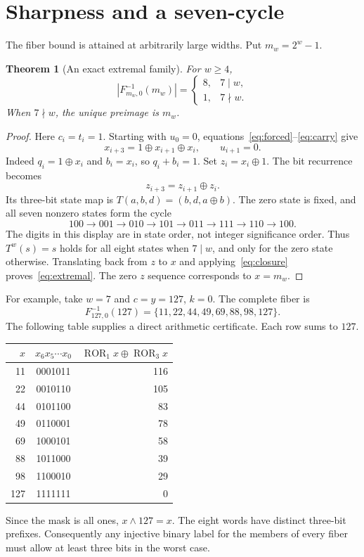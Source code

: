 \documentclass[11pt,a4paper]{article}
\newtheorem{theorem}{Theorem}
\newcommand{\xor}{\mathbin{\oplus}}
\DeclareMathOperator{\ROR}{ROR}
\begin{document}
\section{Sharpness and a seven-cycle}\label{sec:sharp}
The fiber bound is attained at arbitrarily large widths. Put $m_w=2^w-1$.

\begin{theorem}[An exact extremal family]\label{thm:sharp}
For $w\ge4$,
\begin{equation}\label{eq:extremal}
 |F_{m_w,0}^{-1}(m_w)|=
 \begin{cases}8,&7\mid w,\\1,&7\nmid w.\end{cases}
\end{equation}
When $7\nmid w$, the unique preimage is $m_w$.
\end{theorem}

\begin{proof}
Here $c_i=t_i=1$. Starting with $u_0=0$, equations~\eqref{eq:forced}--\eqref{eq:carry} give
\[
 x_{i+3}=1\xor x_{i+1}\xor x_i,\qquad u_{i+1}=0.
\]
Indeed $q_i=1\xor x_i$ and $b_i=x_i$, so $q_i+b_i=1$.
Set $z_i=x_i\xor1$. The bit recurrence becomes
\begin{equation}\label{eq:linear}
 z_{i+3}=z_{i+1}\xor z_i.
\end{equation}
Its three-bit state map is $T(a,b,d)=(b,d,a\xor b)$. The zero state is fixed, and all seven nonzero states form the cycle
\[
 100\to001\to010\to101\to011\to111\to110\to100.
\]
The digits in this display are in state order, not integer significance order. Thus $T^w(s)=s$ holds for all eight states when $7\mid w$, and only for the zero state otherwise. Translating back from $z$ to $x$ and applying~\eqref{eq:closure} proves~\eqref{eq:extremal}. The zero $z$ sequence corresponds to $x=m_w$.
\end{proof}

For example, take $w=7$ and $c=y=127$, $k=0$. The complete fiber is
\begin{equation}\label{eq:example}
 F_{127,0}^{-1}(127)=\{11,22,44,49,69,88,98,127\}.
\end{equation}
The following table supplies a direct arithmetic certificate. Each row sums to $127$.
\begin{center}
\begin{tabular}{rcr}
\toprule
$x$ & $x_6x_5\cdots x_0$ & $\ROR_1x\xor\ROR_3x$\\
\midrule
11 & 0001011 & 116\\
22 & 0010110 & 105\\
44 & 0101100 & 83\\
49 & 0110001 & 78\\
69 & 1000101 & 58\\
88 & 1011000 & 39\\
98 & 1100010 & 29\\
127 & 1111111 & 0\\
\bottomrule
\end{tabular}
\end{center}
Since the mask is all ones, $x\land127=x$. The eight words have distinct three-bit prefixes. Consequently any injective binary label for the members of every fiber must allow at least three bits in the worst case.
\end{document}
